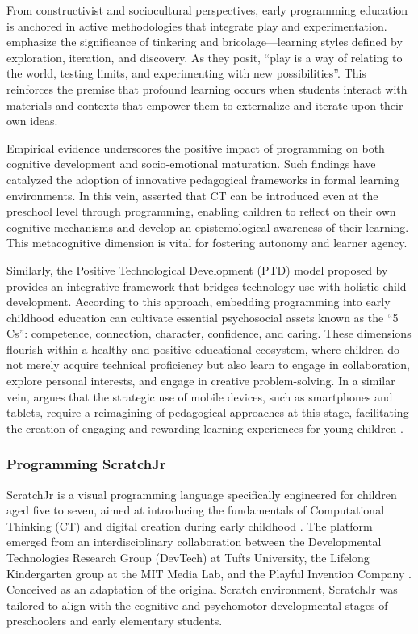 \documentclass[english]{textolivre}
\begin{document}
From constructivist and sociocultural perspectives, early programming education is anchored in active methodologies that integrate play and experimentation. \textcite[p. 165]{resnick2013designing} emphasize the significance of tinkering and bricolage—learning styles defined by exploration, iteration, and discovery. As they posit, “play is a way of relating to the world, testing limits, and experimenting with new possibilities”. This reinforces the premise that profound learning occurs when students interact with materials and contexts that empower them to externalize and iterate upon their own ideas.

Empirical evidence underscores the positive impact of programming on both cognitive development and socio-emotional maturation. Such findings have catalyzed the adoption of innovative pedagogical frameworks in formal learning environments. In this vein, \textcite{papert1985logo} asserted that CT can be introduced even at the preschool level through programming, enabling children to reflect on their own cognitive mechanisms and develop an epistemological awareness of their learning. This metacognitive dimension is vital for fostering autonomy and learner agency.

Similarly, the Positive Technological Development (PTD) model proposed by \textcite[p. 6]{bers2007positive} provides an integrative framework that bridges technology use with holistic child development. According to this approach, embedding programming into early childhood education can cultivate essential psychosocial assets known as the “5 Cs”: competence, connection, character, confidence, and caring. These dimensions flourish within a healthy and positive educational ecosystem, where children do not merely acquire technical proficiency but also learn to engage in collaboration, explore personal interests, and engage in creative problem-solving. In a similar vein, \textcite{bers2008blocks} argues that the strategic use of mobile devices, such as smartphones and tablets, require a reimagining of pedagogical approaches at this stage, facilitating the creation of engaging and rewarding learning experiences for young children \cite{bers2014computational}.

\subsubsection{Programming ScratchJr}\label{sec-conduta}
ScratchJr is a visual programming language specifically engineered for children aged five to seven, aimed at introducing the fundamentals of Computational Thinking (CT) and digital creation during early childhood \cite{bers2016official}. The platform emerged from an interdisciplinary collaboration between the Developmental Technologies Research Group (DevTech) at Tufts University, the Lifelong Kindergarten group at the MIT Media Lab, and the Playful Invention Company \cite{bers2016official}. Conceived as an adaptation of the original Scratch environment, ScratchJr was tailored to align with the cognitive and psychomotor developmental stages of preschoolers and early elementary students.
\end{document}
